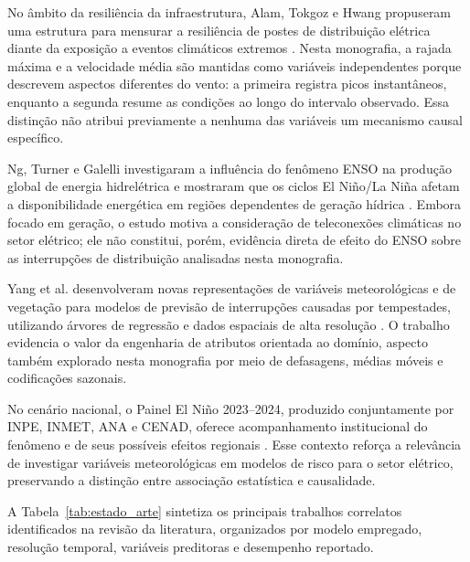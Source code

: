No âmbito da resiliência da infraestrutura, Alam, Tokgoz e Hwang propuseram uma estrutura para mensurar a resiliência de postes de distribuição elétrica diante da exposição a eventos climáticos extremos \cite{murphy2022extreme}. Nesta monografia, a rajada máxima e a velocidade média são mantidas como variáveis independentes porque descrevem aspectos diferentes do vento: a primeira registra picos instantâneos, enquanto a segunda resume as condições ao longo do intervalo observado. Essa distinção não atribui previamente a nenhuma das variáveis um mecanismo causal específico.

Ng, Turner e Galelli investigaram a influência do fenômeno ENSO na produção global de energia hidrelétrica e mostraram que os ciclos El Niño/La Niña afetam a disponibilidade energética em regiões dependentes de geração hídrica \cite{silva2024enso}. Embora focado em geração, o estudo motiva a consideração de teleconexões climáticas no setor elétrico; ele não constitui, porém, evidência direta de efeito do ENSO sobre as interrupções de distribuição analisadas nesta monografia.

Yang et al. desenvolveram novas representações de variáveis meteorológicas e de vegetação para modelos de previsão de interrupções causadas por tempestades, utilizando árvores de regressão e dados espaciais de alta resolução \cite{smith2021hybrid}. O trabalho evidencia o valor da engenharia de atributos orientada ao domínio, aspecto também explorado nesta monografia por meio de defasagens, médias móveis e codificações sazonais.

No cenário nacional, o Painel El Niño 2023--2024, produzido conjuntamente por INPE, INMET, ANA e CENAD, oferece acompanhamento institucional do fenômeno e de seus possíveis efeitos regionais \cite{inpe2023painel}. Esse contexto reforça a relevância de investigar variáveis meteorológicas em modelos de risco para o setor elétrico, preservando a distinção entre associação estatística e causalidade.

A Tabela~\ref{tab:estado_arte} sintetiza os principais trabalhos correlatos identificados na revisão da literatura, organizados por modelo empregado, resolução temporal, variáveis preditoras e desempenho reportado.

